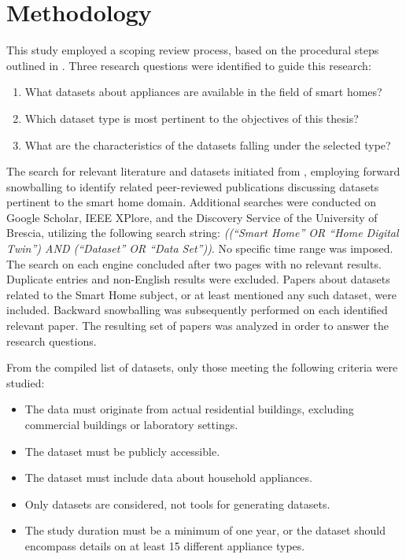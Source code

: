 \chapter{Methodology}\label{ch:methodology}

This study employed a scoping review process, based on the procedural steps outlined in \parencite{makStepsConductingScoping2022}. Three research questions were identified to guide this research:
\begin{enumerate}[label={RQ\arabic*.}, leftmargin=3.5em]
    \item What datasets about appliances are available in the field of smart homes?
    \item Which dataset type is most pertinent to the objectives of this thesis?
    \item What are the characteristics of the datasets falling under the selected type?
\end{enumerate}

The search for relevant literature and datasets initiated from \parencite{barkerSmartOpenData2012}, employing forward snowballing to identify related peer-reviewed publications discussing datasets pertinent to the smart home domain. Additional searches were conducted on Google Scholar, IEEE XPlore, and the Discovery Service of the University of Brescia, utilizing the following search string: \textit{((``Smart Home'' OR ``Home Digital Twin'') AND (``Dataset'' OR ``Data Set''))}. No specific time range was imposed. The search on each engine concluded after two pages with no relevant results. Duplicate entries and non-English results were excluded. Papers about datasets related to the Smart Home subject, or at least mentioned any such dataset, were included. Backward snowballing was subsequently performed on each identified relevant paper. The resulting set of papers was analyzed in order to answer the research questions.

From the compiled list of datasets, only those meeting the following criteria were studied:
\begin{itemize}
    \item The data must originate from actual residential buildings, excluding commercial buildings or laboratory settings.
    \item The dataset must be publicly accessible.
    \item The dataset must include data about household appliances.
    \item Only datasets are considered, not tools for generating datasets.
    \item The study duration must be a minimum of one year, or the dataset should encompass details on at least 15 different appliance types.
\end{itemize}